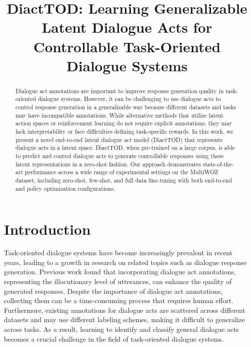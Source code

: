 \title{DiactTOD: Learning Generalizable Latent Dialogue Acts for Controllable Task-Oriented Dialogue Systems}



\maketitle

\begin{abstract}

Dialogue act annotations are important to improve response generation quality in task-oriented dialogue systems.
However, it can be challenging to use dialogue acts to control response generation in a generalizable way because different datasets and tasks may have incompatible annotations.
While alternative methods that utilize latent action spaces or reinforcement learning do not require explicit annotations, they may lack interpretability or face difficulties defining task-specific rewards.
In this work, we present a novel end-to-end latent dialogue act model (DiactTOD) that represents dialogue acts in a latent space.
DiactTOD, when pre-trained on a large corpus, is able to predict and control dialogue acts to generate controllable responses using these latent representations in a zero-shot fashion.
Our approach demonstrates state-of-the-art performance across a wide range of experimental settings on the MultiWOZ dataset, including zero-shot, few-shot, and full data fine-tuning with both end-to-end and policy optimization configurations.

\end{abstract}

\section{Introduction}

Task-oriented dialogue systems have become increasingly prevalent in recent years, leading to a growth in research on related topics such as dialogue response generation. 
Previous work \cite{DBLP:conf/aaai/YangLQ21,he2022galaxy} found that incorporating dialogue act annotations, representing the illocutionary level of utterances, can enhance the quality of generated responses.
Despite the importance of dialogue act annotations, collecting them can be a time-consuming process that requires human effort. 
Furthermore, existing annotations for dialogue acts are scattered across different datasets and may use different labeling schemes, making it difficult to generalize across tasks. 
As a result, learning to identify and classify general dialogue acts becomes a crucial challenge in the field of task-oriented dialogue systems.

